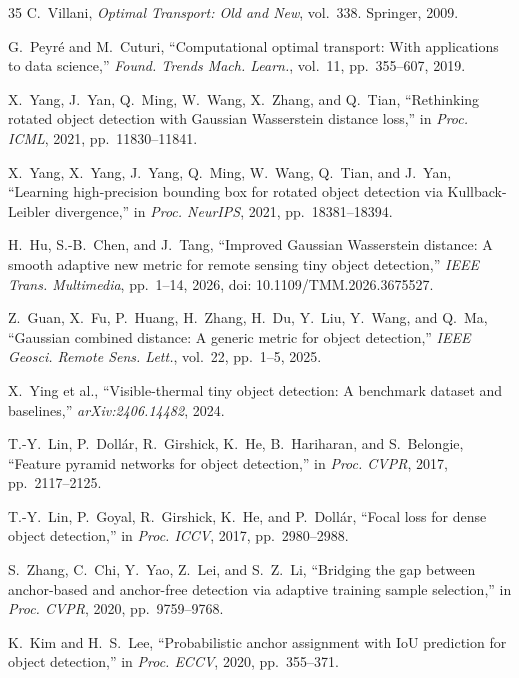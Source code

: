 \documentclass[11pt,a4paper]{article}
\begin{document}
\begin{thebibliography}{35}
  C.~Villani, \emph{Optimal Transport: Old and New}, vol.~338. Springer, 2009.

  G.~Peyr{\'e} and M.~Cuturi, ``Computational optimal transport: With applications to data science,'' \emph{Found. Trends Mach. Learn.}, vol.~11, pp.~355--607, 2019.

  X.~Yang, J.~Yan, Q.~Ming, W.~Wang, X.~Zhang, and Q.~Tian, ``Rethinking rotated object detection with Gaussian Wasserstein distance loss,'' in \emph{Proc. ICML}, 2021, pp.~11830--11841.

  X.~Yang, X.~Yang, J.~Yang, Q.~Ming, W.~Wang, Q.~Tian, and J.~Yan, ``Learning high-precision bounding box for rotated object detection via Kullback-Leibler divergence,'' in \emph{Proc. NeurIPS}, 2021, pp.~18381--18394.

  H.~Hu, S.-B.~Chen, and J.~Tang, ``Improved Gaussian Wasserstein distance: A smooth adaptive new metric for remote sensing tiny object detection,'' \emph{IEEE Trans. Multimedia}, pp.~1--14, 2026, doi: 10.1109/TMM.2026.3675527.

  Z.~Guan, X.~Fu, P.~Huang, H.~Zhang, H.~Du, Y.~Liu, Y.~Wang, and Q.~Ma, ``Gaussian combined distance: A generic metric for object detection,'' \emph{IEEE Geosci. Remote Sens. Lett.}, vol.~22, pp.~1--5, 2025.

  X.~Ying et al., ``Visible-thermal tiny object detection: A benchmark dataset and baselines,'' \emph{arXiv:2406.14482}, 2024.

  T.-Y.~Lin, P.~Doll{\'a}r, R.~Girshick, K.~He, B.~Hariharan, and S.~Belongie, ``Feature pyramid networks for object detection,'' in \emph{Proc. CVPR}, 2017, pp.~2117--2125.

  T.-Y.~Lin, P.~Goyal, R.~Girshick, K.~He, and P.~Doll{\'a}r, ``Focal loss for dense object detection,'' in \emph{Proc. ICCV}, 2017, pp.~2980--2988.

  S.~Zhang, C.~Chi, Y.~Yao, Z.~Lei, and S.~Z.~Li, ``Bridging the gap between anchor-based and anchor-free detection via adaptive training sample selection,'' in \emph{Proc. CVPR}, 2020, pp.~9759--9768.

  K.~Kim and H.~S.~Lee, ``Probabilistic anchor assignment with IoU prediction for object detection,'' in \emph{Proc. ECCV}, 2020, pp.~355--371.


\end{thebibliography}
\end{document}
